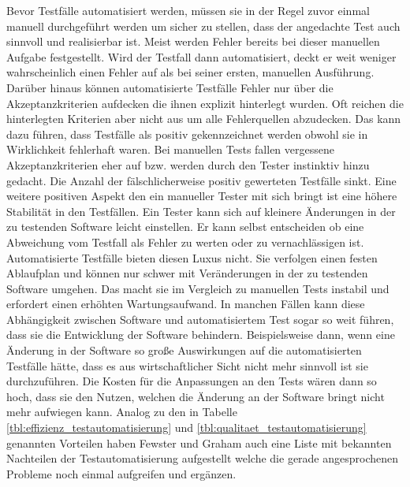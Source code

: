 Bevor Testfälle automatisiert werden, müssen sie in der Regel zuvor einmal manuell durchgeführt werden um sicher zu stellen, dass der angedachte Test auch sinnvoll und realisierbar ist. Meist werden Fehler bereits bei dieser manuellen Aufgabe festgestellt. Wird der Testfall dann automatisiert, deckt er weit weniger wahrscheinlich einen Fehler auf als bei seiner ersten, manuellen Ausführung. Darüber hinaus können automatisierte Testfälle Fehler nur über die Akzeptanzkriterien aufdecken die ihnen explizit hinterlegt wurden. Oft reichen die hinterlegten Kriterien aber nicht aus um alle Fehlerquellen abzudecken. Das kann dazu führen, dass Testfälle als positiv gekennzeichnet werden obwohl sie in Wirklichkeit fehlerhaft waren. Bei manuellen Tests fallen vergessene Akzeptanzkriterien eher auf bzw. werden durch den Tester instinktiv hinzu gedacht. Die Anzahl der fälschlicherweise positiv gewerteten Testfälle sinkt. Eine weitere positiven Aspekt den ein manueller Tester mit sich bringt ist eine höhere Stabilität in den Testfällen. Ein Tester kann sich auf kleinere Änderungen in der zu testenden Software leicht einstellen. Er kann selbst entscheiden ob eine Abweichung vom Testfall als Fehler zu werten oder zu vernachlässigen ist. Automatisierte Testfälle bieten diesen Luxus nicht. Sie verfolgen einen festen Ablaufplan und können nur schwer mit Veränderungen in der zu testenden Software umgehen. Das macht sie im Vergleich zu manuellen Tests instabil und erfordert einen erhöhten Wartungsaufwand. In manchen Fällen kann diese Abhängigkeit zwischen Software und automatisiertem Test sogar so weit führen, dass sie die Entwicklung der Software behindern. Beispielsweise dann, wenn eine Änderung in der Software so große Auswirkungen auf die automatisierten Testfälle hätte, dass es aus wirtschaftlicher Sicht nicht mehr sinnvoll ist sie durchzuführen. Die Kosten für die Anpassungen an den Tests wären dann so hoch, dass sie den Nutzen, welchen die Änderung an der Software bringt nicht mehr aufwiegen kann. \cite[vgl. S. 22 ff.]{fewster_software_1999}
Analog zu den in Tabelle \ref{tbl:effizienz_testautomatisierung} und \ref{tbl:qualitaet_testautomatisierung} genannten Vorteilen haben Fewster und Graham \cite[vgl. S. 10 ff.]{fewster_software_1999} auch eine Liste mit bekannten Nachteilen der Testautomatisierung aufgestellt welche die gerade angesprochenen Probleme noch einmal aufgreifen und ergänzen.

